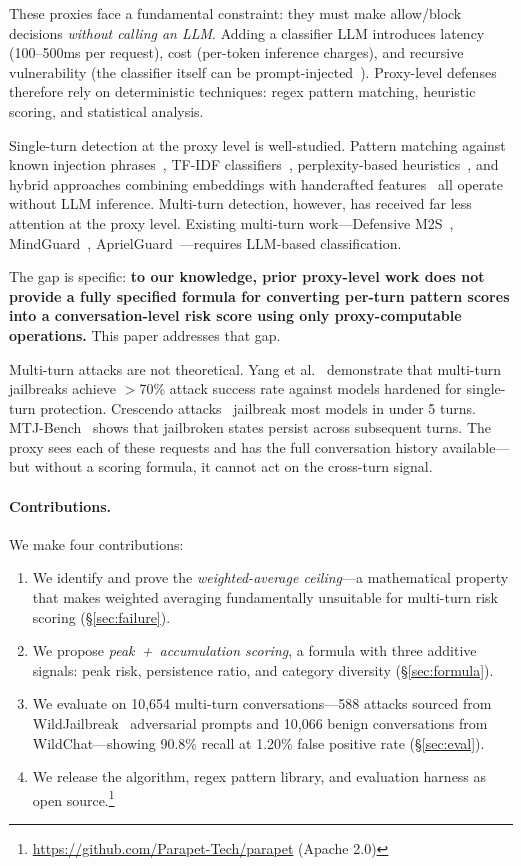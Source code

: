 \documentclass[11pt,a4paper]{article}
\begin{document}
These proxies face a fundamental constraint: they must make
allow/block decisions \emph{without calling an LLM}. Adding a
classifier LLM introduces latency (100--500ms per request), cost
(per-token inference charges), and recursive vulnerability (the
classifier itself can be prompt-injected~\cite{attackermovessecond}).
Proxy-level defenses therefore rely on deterministic techniques: regex
pattern matching, heuristic scoring, and statistical analysis.

Single-turn detection at the proxy level is well-studied. Pattern
matching against known injection phrases~\cite{rebuff}, TF-IDF
classifiers~\cite{promptscreen}, perplexity-based
heuristics~\cite{nemoguardrails}, and hybrid approaches combining
embeddings with handcrafted features~\cite{dmpipmhfe} all operate
without LLM inference. Multi-turn detection, however, has received far
less attention at the proxy level. Existing multi-turn work---Defensive
M2S~\cite{defensivem2s}, MindGuard~\cite{mindguard},
AprielGuard~\cite{aprielguard}---requires LLM-based classification.

The gap is specific: \textbf{to our knowledge, prior proxy-level work
does not provide a fully specified formula for converting per-turn
pattern scores into a conversation-level risk score using only
proxy-computable operations.} This paper addresses that gap.

Multi-turn attacks are not theoretical. Yang et al.~\cite{yangsimpler}
demonstrate that multi-turn jailbreaks achieve $>$70\% attack success
rate against models hardened for single-turn protection. Crescendo
attacks~\cite{crescendo} jailbreak most models in under 5 turns.
MTJ-Bench~\cite{mtjbench} shows that jailbroken states persist across
subsequent turns. The proxy sees each of these requests and has the full
conversation history available---but without a scoring formula, it
cannot act on the cross-turn signal.

\paragraph{Contributions.} We make four contributions:
\begin{enumerate}[nosep]
  \item We identify and prove the \emph{weighted-average ceiling}---a
    mathematical property that makes weighted averaging fundamentally
    unsuitable for multi-turn risk scoring (\S\ref{sec:failure}).
  \item We propose \emph{peak~+~accumulation scoring}, a formula with
    three additive signals: peak risk, persistence ratio, and category
    diversity (\S\ref{sec:formula}).
  \item We evaluate on 10,654 multi-turn conversations---588 attacks
    sourced from WildJailbreak~\cite{wildjailbreak} adversarial prompts
    and 10,066 benign conversations from WildChat---showing 90.8\%
    recall at 1.20\% false positive rate (\S\ref{sec:eval}).
  \item We release the algorithm, regex pattern library, and evaluation
    harness as open source.\footnote{\url{https://github.com/Parapet-Tech/parapet} (Apache 2.0)}
\end{enumerate}
\end{document}
